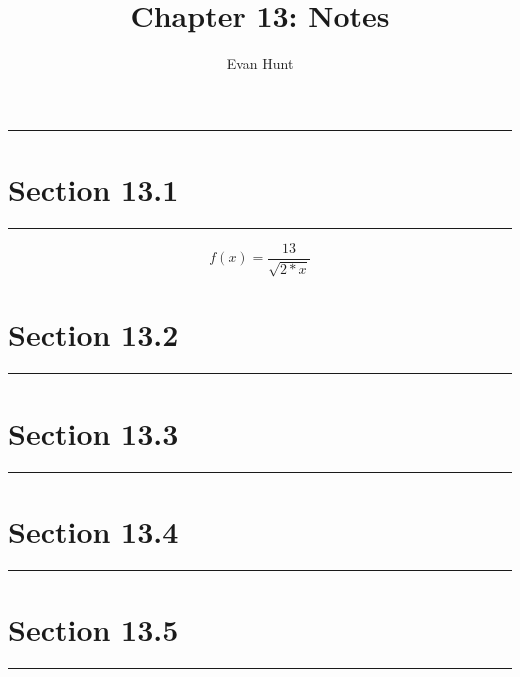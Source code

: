 \documentclass[12pt]{article}
\title{Chapter 13: Notes}
\author{Evan Hunt}
\begin{document}
    \maketitle

    \noindent\rule{\textwidth}{0.4pt}
    \section[]{Section 13.1}
    \noindent\rule{\textwidth}{0.4pt}
        \begin{equation}
            f(x) = \frac{13}{\sqrt{2*x}}
        \end{equation}
    \section[]{Section 13.2}
    \noindent\rule{\textwidth}{0.4pt}
    \section[]{Section 13.3}
    \noindent\rule{\textwidth}{0.4pt}
    \section[]{Section 13.4}
    \noindent\rule{\textwidth}{0.4pt}
    \section[]{Section 13.5}
    \noindent\rule{\textwidth}{0.4pt}
\end{document}
